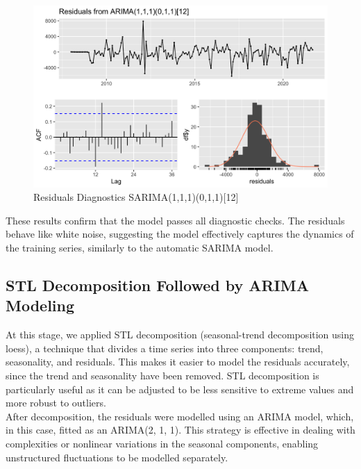 \begin{figure}[H]
    \centering
    \includegraphics[width=1\linewidth]{images/manual_arima.png}
    \caption{Residuals Diagnostics SARIMA(1,1,1)(0,1,1)[12]}
    \label{fig:residual_manual}
\end{figure}


These results confirm that the model passes all diagnostic checks. The residuals behave like white noise, suggesting the model effectively captures the dynamics of the training series, similarly to the automatic SARIMA model.\\

\subsection{STL Decomposition Followed by ARIMA Modeling}

At this stage, we applied STL decomposition (seasonal-trend decomposition using loess), a technique that divides a time series into three components: trend, seasonality, and residuals. This makes it easier to model the residuals accurately, since the trend and seasonality have been removed. STL decomposition is particularly useful as it can be adjusted to be less sensitive to extreme values and more robust to outliers.\\

After decomposition, the residuals were modelled using an ARIMA model, which, in this case, fitted as an ARIMA(2, 1, 1). This strategy is effective in dealing with complexities or nonlinear variations in the seasonal components, enabling unstructured fluctuations to be modelled separately.\\


